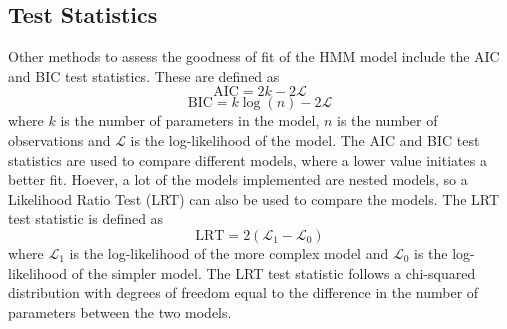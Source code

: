 \subsection{Test Statistics}
Other methods to assess the goodness of fit of the HMM model 
include the AIC \cite{wiki:aic} and BIC \cite{wiki:bic} test statistics. These are defined as
$$
\text{AIC} = 2k - 2\mathcal{L}
$$
$$
\text{BIC} = k \log(n) - 2\mathcal{L}
$$
where $k$ is the number of parameters in the model, $n$ is the number of observations and $\mathcal{L}$ is the log-likelihood of the model. \newline
The AIC and BIC test statistics are used to compare different models, 
where a lower value initiates a better fit. \newline 
Hoever, a lot of the models implemented are nested models, so a Likelihood Ratio Test (LRT) \cite{wiki:lrt} can also be 
used to compare the models. The LRT test statistic is defined as
$$
\text{LRT} = 2(\mathcal{L}_1 - \mathcal{L}_0)
$$
where $\mathcal{L}_1$ is the log-likelihood of the more complex
model and $\mathcal{L}_0$ is the log-likelihood of the simpler model. \newline
The LRT test statistic follows a chi-squared distribution with degrees of freedom equal 
to the difference in the number of parameters between the two models. \newline




